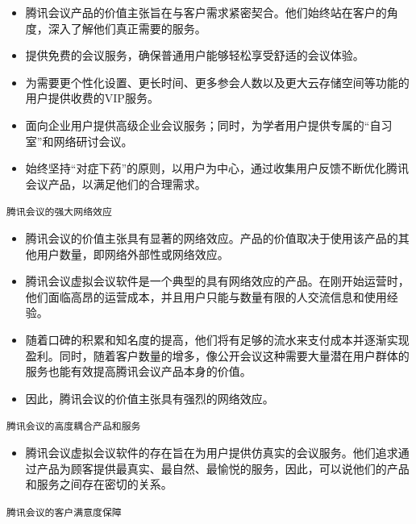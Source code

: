 \documentclass[a4paper,12pt]{article}
\begin{document}
\begin{itemize}
  \item 腾讯会议产品的价值主张旨在与客户需求紧密契合。他们始终站在客户的角度，深入了解他们真正需要的服务。
  
  \item 提供免费的会议服务，确保普通用户能够轻松享受舒适的会议体验。
  
  \item 为需要更个性化设置、更长时间、更多参会人数以及更大云存储空间等功能的用户提供收费的VIP服务。
  
  \item 面向企业用户提供高级企业会议服务；同时，为学者用户提供专属的“自习室”和网络研讨会议。
  
  \item 始终坚持“对症下药”的原则，以用户为中心，通过收集用户反馈不断优化腾讯会议产品，以满足他们的合理需求。
\end{itemize}

\texttt{腾讯会议的强大网络效应}

\begin{itemize}
  \item 腾讯会议的价值主张具有显著的网络效应。产品的价值取决于使用该产品的其他用户数量，即网络外部性或网络效应。
  
  \item 腾讯会议虚拟会议软件是一个典型的具有网络效应的产品。在刚开始运营时，他们面临高昂的运营成本，并且用户只能与数量有限的人交流信息和使用经验。
  
  \item 随着口碑的积累和知名度的提高，他们将有足够的流水来支付成本并逐渐实现盈利。同时，随着客户数量的增多，像公开会议这种需要大量潜在用户群体的服务也能有效提高腾讯会议产品本身的价值。
  
  \item 因此，腾讯会议的价值主张具有强烈的网络效应。
\end{itemize}

\texttt{腾讯会议的高度耦合产品和服务}

\begin{itemize}
  \item 腾讯会议虚拟会议软件的存在旨在为用户提供仿真实的会议服务。他们追求通过产品为顾客提供最真实、最自然、最愉悦的服务，因此，可以说他们的产品和服务之间存在密切的关系。
\end{itemize}

\texttt{腾讯会议的客户满意度保障}
\end{document}
